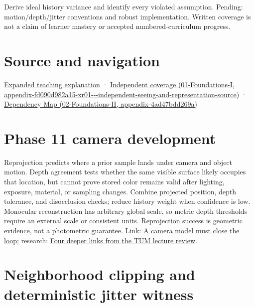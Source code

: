 Derive ideal history variance and identify every violated assumption. Pending: motion/depth/jitter conventions and robust implementation. Written coverage is not a claim of learner mastery or accepted numbered-curriculum progress.

\section{Source and navigation}\label{appendix-0727340a4428-source-and-navigation}

\href{Continuous\%20Notes/University\%20-\%20Worlds,\%20Images\%20and\%20Inference\%20-\%20Graphics,\%20Vision\%20and\%20Photography\#Temporal\%20reconstruction\%20is\%20an\%20inference\%20about\%20correspondence}{Expanded teaching explanation} · \href{../01-Foundations-I/main.pdf\#nameddest=appendix-fd090d982a15-xr01---independent-seeing-and-representation-source}{Independent coverage (01-Foundations-I, appendix-fd090d982a15-xr01-\/-\/-independent-seeing-and-representation-source)} · \href{../02-Foundations-II/main.pdf\#nameddest=appendix-4ad47bdd269a}{Dependency Map (02-Foundations-II, appendix-4ad47bdd269a)}

\section{Phase 11 camera development}\label{appendix-0727340a4428-phase-11-camera-development}

Reprojection predicts where a prior sample lands under camera and object motion. Depth agreement tests whether the same visible surface likely occupies that location, but cannot prove stored color remains valid after lighting, exposure, material, or sampling changes. Combine projected position, depth tolerance, and disocclusion checks; reduce history weight when confidence is low. Monocular reconstruction has arbitrary global scale, so metric depth thresholds require an external scale or consistent units. Reprojection success is geometric evidence, not a photometric guarantee. Link: \href{Continuous\%20Notes/Computing\%20Foundations\%20-\%20From\%20Bits\%20to\%20C++\%20and\%20Systems\%20APIs\#A\%20camera\%20model\%20must\%20close\%20the\%20loop}{A camera model must close the loop}; research: \href{Continuous\%20Notes/Computing\%20Foundations\%20-\%20From\%20Bits\%20to\%20C++\%20and\%20Systems\%20APIs\#Four\%20deeper\%20links\%20from\%20the\%20TUM\%20lecture\%20review}{Four deeper links from the TUM lecture review}.

\section{Neighborhood clipping and deterministic jitter witness}\label{appendix-0727340a4428-neighborhood-clipping-and-deterministic-jitter-witness}

